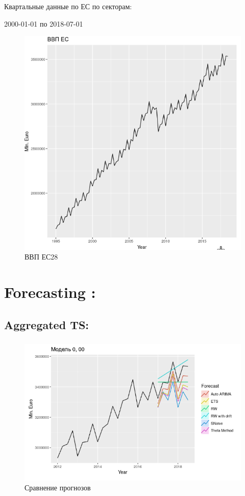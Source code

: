 \documentclass[c, dvipsnames]{beamer}  %
\begin{document}
\begin{frame}[shrink=5]
\frametitle{\insertsection} 
\framesubtitle{\insertsubsection}


Квартальные данные по ЕС по секторам: 

2000-01-01 по 2018-07-01


\begin{figure}
	\centering
	\includegraphics[width=0.7\linewidth]{screenshot021}
	\caption{ВВП ЕС28}
	\label{fig:screenshot021}
\end{figure}





\end{frame}


\section{Forecasting :} 

\subsection{Aggregated TS:} 


\begin{frame}[shrink=5]
\frametitle{\insertsection} 
\framesubtitle{\insertsubsection}



\begin{figure}
	\centering
	\includegraphics[width=0.7\linewidth]{screenshot022}
	\caption{Сравнение прогнозов}
	\label{fig:screenshot021}
\end{figure}





\end{frame}
\end{document}
